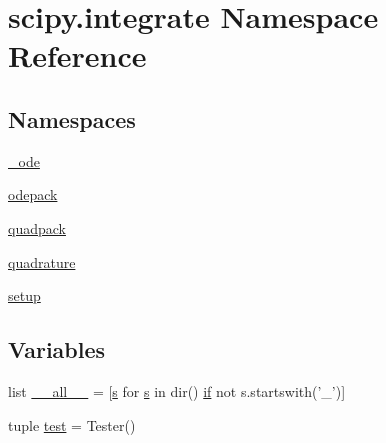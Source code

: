 \hypertarget{namespacescipy_1_1integrate}{}\section{scipy.\+integrate Namespace Reference}
\label{namespacescipy_1_1integrate}
\subsection*{Namespaces}
\begin{DoxyCompactItemize}
\item 
 \hyperlink{namespacescipy_1_1integrate_1_1__ode}{\+\_\+ode}
\item 
 \hyperlink{namespacescipy_1_1integrate_1_1odepack}{odepack}
\item 
 \hyperlink{namespacescipy_1_1integrate_1_1quadpack}{quadpack}
\item 
 \hyperlink{namespacescipy_1_1integrate_1_1quadrature}{quadrature}
\item 
 \hyperlink{namespacescipy_1_1integrate_1_1setup}{setup}
\end{DoxyCompactItemize}
\subsection*{Variables}
\begin{DoxyCompactItemize}
\item 
list \hyperlink{namespacescipy_1_1integrate_ad887b91b6b93340967dfe82daa61ca1b}{\+\_\+\+\_\+all\+\_\+\+\_\+} = \mbox{[}\hyperlink{indexexpr_8h_ae024b0db549122b44c349ae28ec990dc}{s} for \hyperlink{indexexpr_8h_ae024b0db549122b44c349ae28ec990dc}{s} in dir() \hyperlink{minmax_8h_a30a0ee9fee303f01d9c5e6f669e0dfe9}{if} not s.\+startswith('\+\_\+')\mbox{]}
\item 
tuple \hyperlink{namespacescipy_1_1integrate_a1bd54dfd45458d7b9cb45d78ee7e9739}{test} = Tester()
\end{DoxyCompactItemize}


